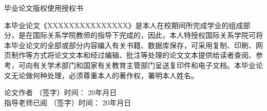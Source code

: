 {%
\thispagestyle{empty}
\pagestyle{empty}

\begin{center}
    \hei\xiaoer %
    {毕业论文版权使用授权书}
\end{center}
\vspace{1cm}

{%
\song\xiaosi
本毕业论文《XXXXXXXXXXXXXXX》是本人在校期间所完成学业的组成部分，是在国际关系学院教师的指导下完成的，因此，本人特授权国际关系学院可将本毕业论文的全部或部分内容编入有关书籍、数据库保存，可采用复制、印刷、网页制作等方式将论文文本和经过编辑、批注等处理的论文文本提供给读者查阅、参考，可向有关学术部门和国家有关教育主管部门呈送复印件和电子文档。本毕业论文无论做何种处理，必须尊重本人的著作权，署明本人姓名。
\vspace{1.5cm}

\noindent
论文作者\hspace{1.5cm} （签字）\hfill 时间：\hspace{0.5cm} 20\underline{\hspace{1.5cm}}年\underline{\hspace{1cm}}月\underline{\hspace{1cm}}日\\

\noindent
指导老师已阅\hspace{1.2cm} （签字）\hfill 时间：\hspace{0.5cm} 20\underline{\hspace{1.5cm}}年\underline{\hspace{1cm}}月\underline{\hspace{1cm}}日

} %
} %

\clearpage